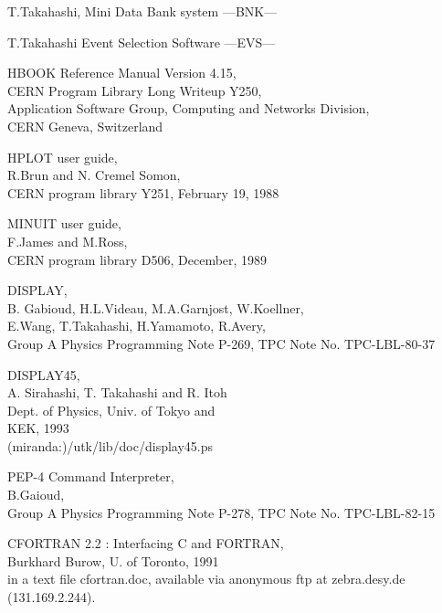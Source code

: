 \begin{thebibliography}{99}


 T.Takahashi, Mini Data Bank system ---BNK---

 T.Takahashi Event Selection Software ---EVS---

 HBOOK Reference Manual Version 4.15,\\
CERN Program Library Long Writeup Y250,\\
Application Software Group,
Computing and Networks Division,\\
CERN Geneva, Switzerland

 HPLOT user guide,\\
R.Brun and N. Cremel Somon,\\
CERN program library Y251,
February 19, 1988

 MINUIT user guide,\\
F.James and M.Ross,\\
CERN program library D506,
December, 1989

 DISPLAY,\\
B. Gabioud, H.L.Videau, M.A.Garnjost, W.Koellner, \\
E.Wang, T.Takahashi, H.Yamamoto, R.Avery,\\
Group A Physics Programming Note P-269, TPC Note No. TPC-LBL-80-37

 DISPLAY45,\\
A. Sirahashi, T. Takahashi and R. Itoh \\
Dept. of Physics, Univ. of Tokyo and \\
KEK, 1993 \\
(miranda:)/utk/lib/doc/display45.ps

 PEP-4 Command Interpreter,\\
B.Gaioud,\\
Group A Physics Programming Note P-278, TPC Note No. TPC-LBL-82-15

 CFORTRAN 2.2  :  Interfacing C and FORTRAN, \\
Burkhard Burow, U. of Toronto, 1991 \\
in a text file cfortran.doc,
available via anonymous ftp at zebra.desy.de (131.169.2.244).
\end{thebibliography}
